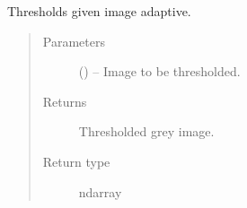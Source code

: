 \documentclass[letterpaper,10pt,english]{sphinxmanual}
\begin{document}
\begin{fulllineitems}
\label{\detokenize{image_helpers:image_helpers.adaptive_thresh}}
Thresholds given image adaptive.
\begin{quote}\begin{description}
\item[{Parameters}] \leavevmode
{} () -- Image to be thresholded.

\item[{Returns}] \leavevmode
Thresholded grey image.

\item[{Return type}] \leavevmode
ndarray

\end{description}\end{quote}

\end{fulllineitems}

\end{document}
